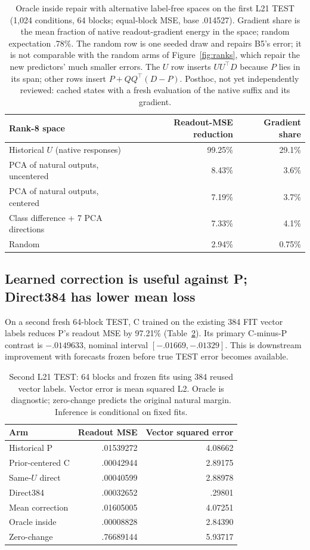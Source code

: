 \documentclass[11pt]{article}
\begin{document}
\begin{table}[ht]\centering\small
\begin{tabular}{lrr}\toprule Rank-8 space & Readout-MSE reduction & Gradient share\\\midrule
Historical $U$ (native responses) & 99.25\% & 29.1\%\\
PCA of natural outputs, uncentered & 8.43\% & 3.6\%\\
PCA of natural outputs, centered & 7.19\% & 3.7\%\\
Class difference + 7 PCA directions & 7.33\% & 4.1\%\\
Random & 2.94\% & 0.75\%\\\bottomrule\end{tabular}
\caption{Oracle inside repair with alternative label-free spaces on the first L21 TEST (1,024 conditions, 64 blocks; equal-block MSE, base .014527). Gradient share is the mean fraction of native readout-gradient energy in the space; random expectation .78\%. The random row is one seeded draw and repairs B5's error; it is not comparable with the random arms of Figure~\ref{fig:ranks}, which repair the new predictors' much smaller errors. The $U$ row inserts $UU^\top D$ because $P$ lies in its span; other rows insert $P+QQ^\top(D-P)$. Posthoc, not yet independently reviewed: cached states with a fresh evaluation of the native suffix and its gradient.}\label{tab:spaces}
\end{table}

\subsection{Learned correction is useful against P; Direct384 has lower mean loss}
On a second fresh 64-block TEST, C trained on the existing 384 FIT vector labels reduces P's readout MSE by 97.21\% (Table~\ref{tab:learned}). Its primary C-minus-P contrast is $-.0149633$, nominal interval $[-.01669,-.01329]$. This is downstream improvement with forecasts frozen before true TEST error becomes available.

\begin{table}[ht]\centering\small
\begin{tabular}{lrr}\toprule Arm & Readout MSE & Vector squared error\\\midrule
Historical P & .01539272 & 4.08662\\
Prior-centered C & .00042944 & 2.89175\\
Same-$U$ direct & .00040599 & 2.88978\\
Direct384 & .00032652 & .29801\\
Mean correction & .01605005 & 4.07251\\
Oracle inside & .00008828 & 2.84390\\
Zero-change & .76689144 & 5.93717\\\bottomrule\end{tabular}
\caption{Second L21 TEST: 64 blocks and frozen fits using 384 reused vector labels. Vector error is mean squared L2. Oracle is diagnostic; zero-change predicts the original natural margin. Inference is conditional on fixed fits.}\label{tab:learned}
\end{table}
\end{document}
